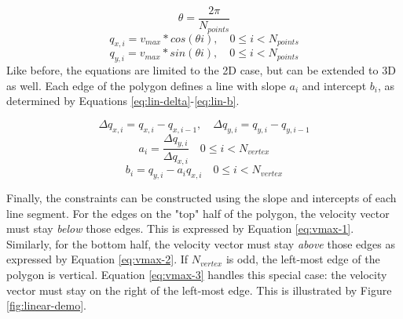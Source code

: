 \begin{equation}
\label{eq:maxvel-theta}
\theta = \dfrac{2\pi}{N_{points}}
\end{equation}
\begin{equation}
\label{eq:maxvel-points-x}
q_{x,i}  = v_{max} * cos( \theta i), \quad 0 \leq i < N_{points}
\end{equation}
\begin{equation}
\label{eq:maxvel-points-y}
q_{y,i}  = v_{max} * sin( \theta i), \quad 0 \leq i < N_{points}
\end{equation}
Like before, the equations are limited to the 2D case, but can be extended to 3D as well. Each edge of the polygon defines a line with slope $a_i$ and intercept $b_i$, as determined by Equations \ref{eq:lin-delta}-\ref{eq:lin-b}.

\begin{equation}
\label{eq:lin-delta}
\Delta q_{x,i} = q_{x,i} - q_{x,i-1}, \quad \Delta q_{y,i} = q_{y,i} - q_{y,i-1}
\end{equation}
\begin{equation}
\label{eq:lin-a}
a_i = \dfrac{\Delta q_{y,i}}{\Delta q_{x,i}} \quad 0 \leq i < N_{vertex}
\end{equation}
\begin{equation}
\label{eq:lin-b}
b_i = q_{y,i} - a_i q_{x,i}  \quad 0 \leq i < N_{vertex}
\end{equation}


Finally, the constraints can be constructed using the slope and intercepts of each line segment. For the edges on the "top" half of the polygon, the velocity vector must stay \emph{below} those edges. This is expressed by Equation \ref{eq:vmax-1}. Similarly, for the bottom half, the velocity vector must stay \emph{above} those edges as expressed by Equation \ref{eq:vmax-2}. If $N_{vertex}$ is odd, the left-most edge of the polygon is vertical. Equation \ref{eq:vmax-3} handles this special case: the velocity vector must stay on the right of the left-most edge. This is illustrated by Figure \ref{fig:linear-demo}.

